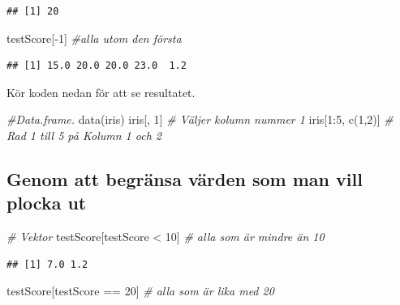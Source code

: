 \documentclass[
]{book}
\newenvironment{Shaded}{\begin{snugshade}}{\end{snugshade}}
\newcommand{\CommentTok}[1]{\textcolor[rgb]{0.56,0.35,0.01}{\textit{#1}}}
\newcommand{\DecValTok}[1]{\textcolor[rgb]{0.00,0.00,0.81}{#1}}
\newcommand{\FunctionTok}[1]{\textcolor[rgb]{0.00,0.00,0.00}{#1}}
\newcommand{\NormalTok}[1]{#1}
\newcommand{\SpecialCharTok}[1]{\textcolor[rgb]{0.00,0.00,0.00}{#1}}
\begin{document}
\begin{verbatim}
## [1] 20
\end{verbatim}

\begin{Shaded}
\begin{Highlighting}[]
\NormalTok{testScore[}\SpecialCharTok{{-}}\DecValTok{1}\NormalTok{] }\CommentTok{\#alla utom den första}
\end{Highlighting}
\end{Shaded}

\begin{verbatim}
## [1] 15.0 20.0 20.0 23.0  1.2
\end{verbatim}

Kör koden nedan för att se resultatet.

\begin{Shaded}
\begin{Highlighting}[]
\CommentTok{\#Data.frame.}
\FunctionTok{data}\NormalTok{(iris)}
\NormalTok{iris[, }\DecValTok{1}\NormalTok{] }\CommentTok{\# Väljer kolumn nummer 1}
\NormalTok{iris[}\DecValTok{1}\SpecialCharTok{:}\DecValTok{5}\NormalTok{, }\FunctionTok{c}\NormalTok{(}\DecValTok{1}\NormalTok{,}\DecValTok{2}\NormalTok{)] }\CommentTok{\# Rad 1 till 5 på Kolumn 1 och 2}
\end{Highlighting}
\end{Shaded}

\hypertarget{genom-att-begruxe4nsa-vuxe4rden-som-man-vill-plocka-ut}{%
\subsection{Genom att begränsa värden som man vill plocka ut}\label{genom-att-begruxe4nsa-vuxe4rden-som-man-vill-plocka-ut}}

\begin{Shaded}
\begin{Highlighting}[]
\CommentTok{\# Vektor}
\NormalTok{testScore[testScore }\SpecialCharTok{\textless{}} \DecValTok{10}\NormalTok{] }\CommentTok{\# alla som är mindre än 10}
\end{Highlighting}
\end{Shaded}

\begin{verbatim}
## [1] 7.0 1.2
\end{verbatim}

\begin{Shaded}
\begin{Highlighting}[]
\NormalTok{testScore[testScore }\SpecialCharTok{==} \DecValTok{20}\NormalTok{] }\CommentTok{\# alla som är lika med 20}
\end{Highlighting}
\end{Shaded}
\end{document}
